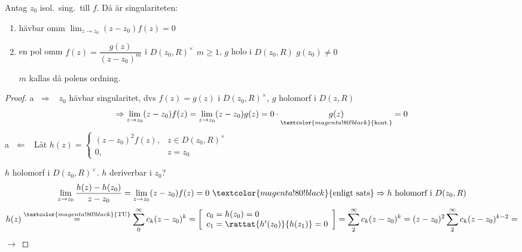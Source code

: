 \begin{theorem}
Antag $z_0$ isol.\ sing.\ till $f$. Då är singulariteten:
\begin{enumerate}[label=\textcolor{red!70!black}{\textcircled{\alph*}}]
  \item hävbar omm $\displaystyle\lim_{z \to z_0} (z - z_0)f(z) = 0$
  \item en pol omm $f(z) = \dfrac{g(z)}{(z - z_0)^m}$ i $D(z_0, R)^\times$ \quad $m \ge 1$, $g$ holo i $D(z_0, R)$ $g(z_0) \neq 0$

  $m$ kallas då polens ordning.
\end{enumerate}
\end{theorem}
\begin{proof}
\textcircled{a} $\Rightarrow$ \ $z_0$ hävbar singularitet, dvs $f(z) = g(z)$ i $D(z_0, R)^\times$, $g$ holomorf i $D(z, R)$
\[ \Rightarrow \lim_{z \to z_0} (z - z_0)f(z) = \lim_{z \to z_0} (z - z_0)g(z) = 0 \cdot \underset{\textcolor{magenta!80!black}{\text{kont.}}}{g(z)} = 0 \]
\textcircled{a} $\Leftarrow$ \ Låt $h(z) = \begin{cases} (z - z_0)^2 f(z), & z \in D(z_0, R)^\times \\ 0, & z = z_0 \end{cases}$

$h$ holomorf i $D(z_0, R)^\times$. $h$  deriverbar i $z_0$?
\[ \lim_{z \to z_0} \frac{h(z) - h(z_0)}{z - z_0} = \lim_{z \to z_0} (z - z_0)f(z) = 0 \ \textcolor{magenta!80!black}{\text{enligt sats}} \Rightarrow h \text{ holomorf i } D(z_0, R) \]
\[ h(z) \overset{\textcolor{magenta!80!black}{\text{TU}}}{=} \sum_0^\infty c_k(z - z_0)^k = \left[ \begin{array}{l} c_0 = h(z_0) = 0 \\ c_1 = \rattat{h'(z_0)}{h(z_1)} = 0 \end{array} \right] = \sum_2^\infty c_k(z - z_0)^k = (z - z_0)^2 \sum_2^\infty c_k(z - z_0)^{k-2} = \]
\hfill $\longrightarrow$
\end{proof}
